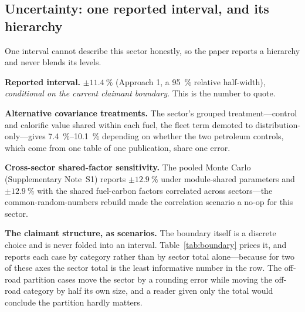 \subsection{Uncertainty: one reported interval, and its hierarchy}
\label{sec:threeuncertainty}

One interval cannot describe this sector honestly, so the paper reports a hierarchy and
never blends its levels.

\textbf{Reported interval.} $\pm\SI{11.4}{\percent}$ (Approach 1, a
\SI{95}{\percent} relative half-width), \emph{conditional on the current claimant
boundary}. This is the number to quote.

\textbf{Alternative covariance treatments.} The sector's grouped treatment---control and
calorific value shared within each fuel, the fleet term demoted to
distribution-only---gives \SIrange{7.4}{10.1}{\percent} depending on whether the two
petroleum controls, which come from one table of one publication, share one error.

\textbf{Cross-sector shared-factor sensitivity.} The pooled Monte Carlo (Supplementary
Note~S1) reports $\pm\SI{12.9}{\percent}$ under module-shared parameters and
$\pm\SI{12.9}{\percent}$ with the shared fuel-carbon factors correlated across
sectors---the common-random-numbers rebuild made the correlation scenario a no-op for
this sector.

\textbf{The claimant structure, as scenarios.} The boundary itself is a discrete choice
and is never folded into an interval. Table~\ref{tab:boundary} prices it, and reports each
case by category rather than by sector total alone---because for two of these axes the
sector total is the least informative number in the row. The off-road partition cases move
the sector by a rounding error while moving the off-road category by half its own size,
and a reader given only the total would conclude the partition hardly matters.

